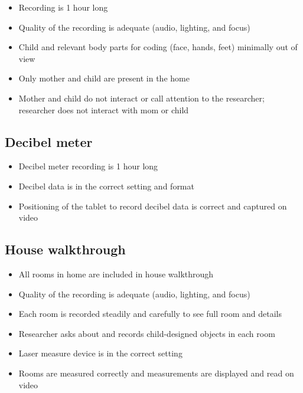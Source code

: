 \documentclass[
  12pt,
]{book}
\providecommand{\tightlist}{%
  \setlength{\itemsep}{0pt}\setlength{\parskip}{0pt}}
\begin{document}
\begin{itemize}
\tightlist
\item
  Recording is 1 hour long
\item
  Quality of the recording is adequate (audio, lighting, and focus)
\item
  Child and relevant body parts for coding (face, hands, feet) minimally out of view
\item
  Only mother and child are present in the home
\item
  Mother and child do not interact or call attention to the researcher; researcher does not interact with mom or child
\end{itemize}

\hypertarget{decibel-meter-1}{%
\subsection{Decibel meter}\label{decibel-meter-1}}

\begin{itemize}
\tightlist
\item
  Decibel meter recording is 1 hour long
\item
  Decibel data is in the correct setting and format
\item
  Positioning of the tablet to record decibel data is correct and captured on video
\end{itemize}

\hypertarget{house-walkthrough}{%
\subsection{House walkthrough}\label{house-walkthrough}}

\begin{itemize}
\tightlist
\item
  All rooms in home are included in house walkthrough
\item
  Quality of the recording is adequate (audio, lighting, and focus)
\item
  Each room is recorded steadily and carefully to see full room and details
\item
  Researcher asks about and records child-designed objects in each room
\item
  Laser measure device is in the correct setting
\item
  Rooms are measured correctly and measurements are displayed and read on video
\end{itemize}
\end{document}

